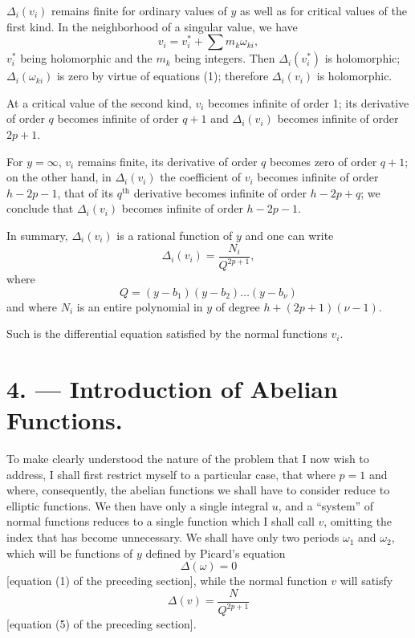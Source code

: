 \documentclass{article}
\begin{document}
$\Delta_{i}(v_{i})$ remains finite for ordinary values of $y$ as well as for critical values of the first kind. In the neighborhood of a singular value, we have
\[
v_{i} = v_{i}^{*} + \sum m_{k} \omega_{ki},
\]
$v_{i}^{*}$ being holomorphic and the $m_{k}$ being integers. Then $\Delta_{i}(v_{i}^{*})$ is holomorphic; $\Delta_{i}(\omega_{ki})$ is zero by virtue of equations (1); therefore $\Delta_{i}(v_{i})$ is holomorphic.

At a critical value of the second kind, $v_{i}$ becomes infinite of order 1; its derivative of order $q$ becomes infinite of order $q+1$ and $\Delta_{i}(v_{i})$ becomes infinite of order $2p+1$.

For $y = \infty$, $v_{i}$ remains finite, its derivative of order $q$ becomes zero of order $q+1$; on the other hand, in $\Delta_{i}(v_{i})$ the coefficient of $v_{i}$ becomes infinite of order $h - 2p - 1$, that of its $q^{\text{th}}$ derivative becomes infinite of order $h - 2p + q$; we conclude that $\Delta_{i}(v_{i})$ becomes infinite of order $h - 2p - 1$.

In summary, $\Delta_{i}(v_{i})$ is a rational function of $y$ and one can write
\[
\Delta_{i}(v_{i}) = \frac{N_{i}}{Q^{2p+1}}, \tag{5}
\]
where
\[
Q = (y - b_{1})(y - b_{2})\ldots (y - b_{\nu})
\]
and where $N_{i}$ is an entire polynomial in $y$ of degree $h + (2p+1)(\nu - 1)$.

Such is the differential equation satisfied by the normal functions $v_{i}$.

\section*{4. --- Introduction of Abelian Functions.}

To make clearly understood the nature of the problem that I now wish to address, I shall first restrict myself to a particular case, that where $p = 1$ and where,
consequently, the abelian functions we shall have to consider reduce to elliptic functions. We then have only a single integral $u$, and a ``system'' of normal functions reduces to a single function which I shall call $v$, omitting the index that has become unnecessary. We shall have only two periods $\omega_{1}$ and $\omega_{2}$, which will be functions of $y$ defined by Picard's equation
\[
\Delta(\omega) = 0 \tag{1}
\]
[equation (1) of the preceding section], while the normal function $v$ will satisfy
\[
\Delta(v) = \frac{N}{Q^{2p+1}} \tag{2}
\]
[equation (5) of the preceding section].
\end{document}
